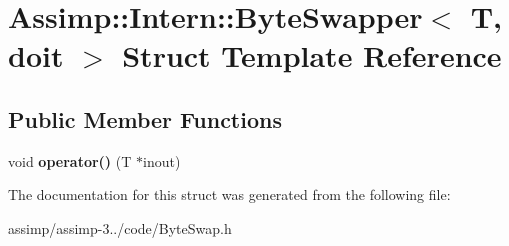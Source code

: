 \hypertarget{struct_assimp_1_1_intern_1_1_byte_swapper}{\section{Assimp\+:\+:Intern\+:\+:Byte\+Swapper$<$ T, doit $>$ Struct Template Reference}
\label{struct_assimp_1_1_intern_1_1_byte_swapper}
}
\subsection*{Public Member Functions}
\begin{DoxyCompactItemize}
\item 
\hypertarget{struct_assimp_1_1_intern_1_1_byte_swapper_a3531b179de4ba56b6873676b1fba0205}{void {\bfseries operator()} (T $\ast$inout)}\label{struct_assimp_1_1_intern_1_1_byte_swapper_a3531b179de4ba56b6873676b1fba0205}

\end{DoxyCompactItemize}


The documentation for this struct was generated from the following file\+:\begin{DoxyCompactItemize}
\item 
assimp/assimp-\/3../code/Byte\+Swap.\+h\end{DoxyCompactItemize}
